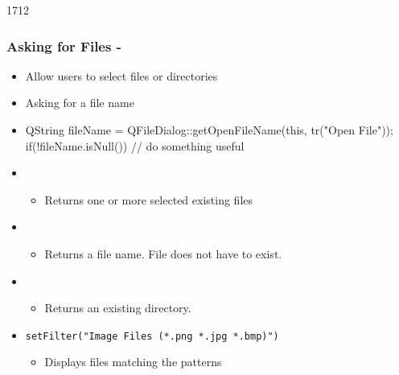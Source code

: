 \begin{slide}[fragile]{1712}
  \frametitle{Asking for Files - }
  \begin{itemize}
  \item Allow users to select files or directories
  \item Asking for a file name
  \item[]
    \begin{cpp}
QString fileName = 
  QFileDialog::getOpenFileName(this, tr("Open File"));      
if(!fileName.isNull()) {
  // do something useful
}
    \end{cpp}
  \item {}
    \begin{itemize}
    \item Returns one or more selected existing files
    \end{itemize}
  \item {}
    \begin{itemize}
    \item Returns a file name. File does not have to exist.
    \end{itemize}
  \item {}
    \begin{itemize}
    \item Returns an existing directory.
    \end{itemize}
  \item \texttt{setFilter("Image Files (*.png *.jpg *.bmp)")}
    \begin{itemize}
    \item Displays files matching the patterns
    \end{itemize}
  \end{itemize}
\end{slide}

